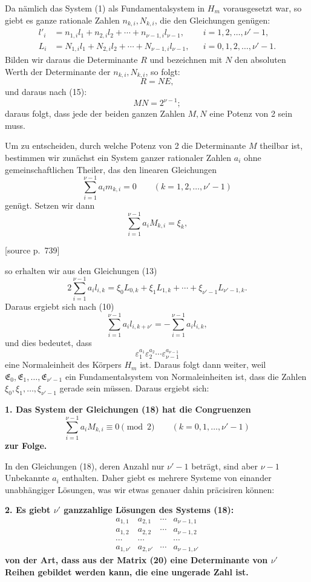 \documentclass[11pt]{article}
\newcommand{\srcpage}[1]{\par\medskip\noindent\textsf{[source p.~#1]}\par\smallskip}
\begin{document}
Da nämlich das System (1) als Fundamentalsystem in $H_m$ vorausgesetzt war, so giebt es ganze rationale Zahlen $n_{k,i},N_{k,i}$, die den Gleichungen genügen:
\begin{equation}
\begin{aligned}
l'_i&=n_{1,i}l_1+n_{2,i}l_2+\cdots+n_{\nu-1,i}l_{\nu-1},&& i=1,2,\ldots,\nu'-1,\\
L_i&=N_{1,i}l_1+N_{2,i}l_2+\cdots+N_{\nu-1,i}l_{\nu-1},&& i=0,1,2,\ldots,\nu'-1.
\end{aligned}
\tag{17}
\end{equation}
Bilden wir daraus die Determinante $R$ und bezeichnen mit $N$ den absoluten Werth der Determinante der $n_{k,i},N_{k,i}$, so folgt:
\[
R=NE,
\]
und daraus nach (15):
\[
MN=2^{\nu-1};
\]
daraus folgt, dass jede der beiden ganzen Zahlen $M,N$ eine Potenz von 2 sein muss.

Um zu entscheiden, durch welche Potenz von 2 die Determinante $M$ theilbar ist, bestimmen wir zunächst ein System ganzer rationaler Zahlen $a_i$ ohne gemeinschaftlichen Theiler, das den linearen Gleichungen
\begin{equation}
\sum_{i=1}^{\nu-1}a_im_{k,i}=0\qquad(k=1,2,\ldots,\nu'-1)
\tag{18}
\end{equation}
genügt. Setzen wir dann
\[
\sum_{i=1}^{\nu-1}a_iM_{k,i}=\xi_k,
\]
\srcpage{739}
so erhalten wir aus den Gleichungen (13)
\[
2\sum_{i=1}^{\nu-1}a_il_{i,k}=\xi_0L_{0,k}+\xi_1L_{1,k}+\cdots+\xi_{\nu'-1}L_{\nu'-1,k}.
\]
Daraus ergiebt sich nach (10)
\[
\sum_{i=1}^{\nu-1}a_il_{i,k+\nu'}=-\sum_{i=1}^{\nu-1}a_il_{i,k},
\]
und dies bedeutet, dass
\[
\varepsilon_1^{a_1}\varepsilon_2^{a_2}\cdots\varepsilon_{\nu-1}^{a_{\nu-1}}
\]
eine Normaleinheit des Körpers $H_m$ ist. Daraus folgt dann weiter, weil $\mathfrak E_0,\mathfrak E_1,\ldots,\mathfrak E_{\nu'-1}$ ein Fundamentalsystem von Normaleinheiten ist, dass die Zahlen $\xi_0,\xi_1,\ldots,\xi_{\nu'-1}$ gerade sein müssen. Daraus ergiebt sich:

\begin{center}\textbf{1. Das System der Gleichungen (18) hat die Congruenzen
\[
\sum_{i=1}^{\nu-1}a_iM_{k,i}\equiv0\pmod2\qquad(k=0,1,\ldots,\nu'-1)
\tag{19}
\]
zur Folge.}\end{center}

In den Gleichungen (18), deren Anzahl nur $\nu'-1$ beträgt, sind aber $\nu-1$ Unbekannte $a_i$ enthalten. Daher giebt es mehrere Systeme von einander unabhängiger Lösungen, was wir etwas genauer dahin präcisiren können:

\begin{center}\textbf{2. Es giebt $\nu'$ ganzzahlige Lösungen des Systems (18):}
\[
\begin{array}{cccc}
a_{1,1}&a_{2,1}&\cdots&a_{\nu-1,1}\\
a_{1,2}&a_{2,2}&\cdots&a_{\nu-1,2}\\
\cdots&\cdots&&\cdots\\
a_{1,\nu'}&a_{2,\nu'}&\cdots&a_{\nu-1,\nu'}
\end{array}
\tag{20}
\]
\textbf{von der Art, dass aus der Matrix (20) eine Determinante von $\nu'$ Reihen gebildet werden kann, die eine ungerade Zahl ist.}\end{center}
\end{document}
